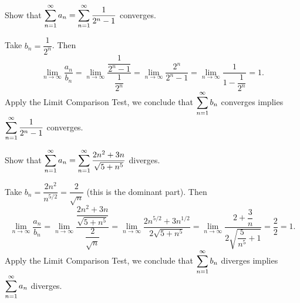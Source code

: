 \begin{ex} 
    Show that $\displaystyle\sum_{n=1}^\infty a_n = \displaystyle\sum_{n=1}^\infty  \dfrac{1}{2^n - 1}$ converges.

    Take $b_n = \dfrac{1}{2^n}$. Then
    \[\lim_{n \to \infty} \dfrac{a_n}{b_n} = \lim_{n \to \infty} \dfrac{\dfrac{1}{2^n - 1}}{\dfrac{1}{2^n}} = \lim_{n \to \infty} \dfrac{2^n}{2^n-1} = \lim_{n \to \infty} \dfrac{1}{1-\dfrac{1}{2^n}} = 1.\]
    Apply the Limit Comparison Test, we conclude that $\displaystyle\sum_{n=1}^\infty b_n$ converges implies  $\displaystyle\sum_{n=1}^\infty \dfrac{1}{2^n - 1}$ converges.
\end{ex}

\begin{ex} 
    Show that $\displaystyle\sum_{n=1}^\infty a_n = \displaystyle\sum_{n=1}^\infty \dfrac{2n^2 + 3n}{\sqrt{5+n^5}}$ diverges.

    Take $b_n = \dfrac{2n^2}{n^{5/2}} = \dfrac{2}{\sqrt{n}}$ (this is the dominant part). Then
    \[\lim_{n \to \infty} \dfrac{a_n}{b_n} = \lim_{n \to \infty} \dfrac{\dfrac{2n^2 + 3n}{\sqrt{5+n^5}}}{\dfrac{2}{\sqrt{n}}} = \lim_{n \to \infty} \dfrac{2n^{5/2}+3n^{1/2}}{2\sqrt{5+n^5}} = \lim_{n \to \infty} \dfrac{2+\dfrac{3}{n}}{2\sqrt{\dfrac{5}{n^5}+1}} = \dfrac{2}{2} = 1.\]
    Apply the Limit Comparison Test, we conclude that $\displaystyle\sum_{n=1}^\infty b_n$ diverges implies $\displaystyle\sum_{n=1}^\infty a_n$ diverges.
\end{ex}

